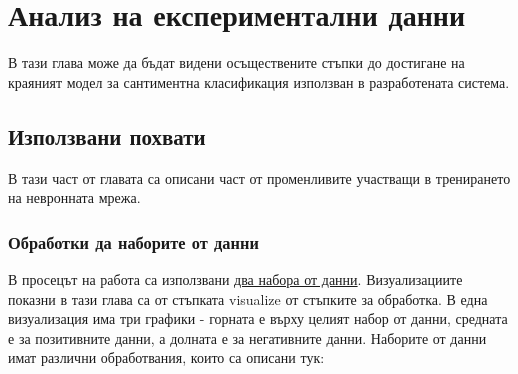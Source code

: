 \documentclass{article}
\begin{document}
\newpage\section{Анализ на експериментални данни}

В тази глава може да бъдат видени осъществените стъпки до достигане на краяният модел за сантиментна класификация
използван в разработената система.

\subsection{Използвани похвати}

В тази част от главата са описани част от променливите участващи в тренирането на невронната мрежа.

\subsubsection{Обработки да наборите от данни}

В просецът на работа са използвани \hyperref[sec:dataset]{два набора от данни}. Визуализациите показни в тази глава са
от стъпката visualize от стъпките за обработка. В една визуализация има три графики - горната е върху целият набор от
данни, средната е за позитивните данни, а долната е за негативните данни. Наборите от данни имат различни обработвания,
които са описани тук:
\end{document}
